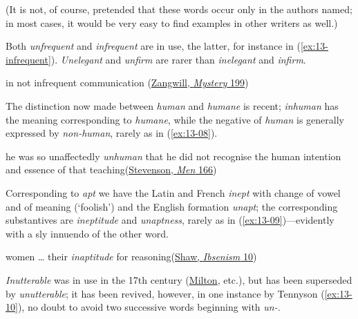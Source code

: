\bigskip
\setlength{\leftskip}{0em}

(It is not, of course, pretended that these words occur only in the authors named; in most cases, it would be very easy to find examples in other writers as well.)

Both \textit{unfrequent} and \textit{infrequent} are in use, the latter, for instance in (\ref{ex:13-infrequent}). \textit{Unelegant} and \textit{unfirm} are rarer than \textit{inelegant} and \textit{infirm}.

\ea \label{ex:13-infrequent}
in not infrequent communication \hfill (\href{https://archive.org/details/greywigstoriesno00zang/page/274/mode/2up?q=%22not+infrequent%22&view=theater}{Zangwill, \textit{Mystery} 199})
\z

The distinction now made between \textit{human} and \textit{humane} is recent; \textit{inhuman} has the meaning corresponding to \textit{humane}, while the negative of \textit{human} is generally expressed by \textit{non-human}, rarely as in (\ref{ex:13-08}). 

\ea \label{ex:13-08} he was so unaffectedly \textit{unhuman} that he did not recognise the human intention and essence of that teaching\hfill(\href{https://archive.org/details/familiarstudies00stevuoft/page/168/mode/2up?view=theater&q=%22unaffectedly+unhuman%22}{Stevenson, \textit{Men} 166}) %
\z

Corresponding to \textit{apt} we have the Latin and French \textit{inept} with change of vowel and of meaning (`foolish') and the English formation \textit{unapt}; the corresponding substantives are \textit{ineptitude} and \textit{unaptness}, rarely as in (\ref{ex:13-09})---evidently with a sly innuendo of the other word.

\ea \label{ex:13-09}
women {\dots} their \textit{inaptitude} for reasoning\hfill(\href{https://archive.org/details/quintessenceofib00shawrich/page/10/mode/2up?q=inaptitude&view=theater}{Shaw, \textit{Ibsenism} 10})
\z

\textit{Inutterable} was in use in the 17th century (\href{https://archive.org/details/poeticalworksofj00miltiala/page/216/mode/2up?ref=ol&view=theater&q=%22abominable%22}{Milton}, etc.), but has been superseded by \textit{unutterable}; it has been revived, however, in one instance by Tennyson (\ref{ex:13-10}), no doubt to avoid two successive words beginning with \textit{un-}.

